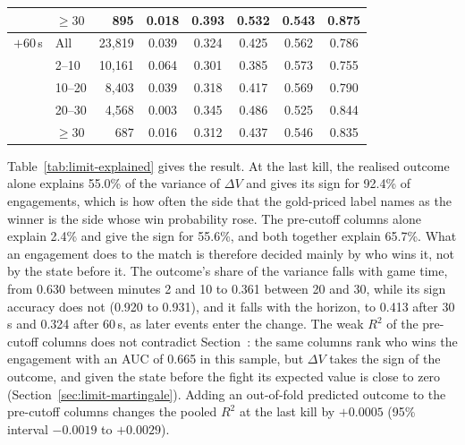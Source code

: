 \begin{table}[!t]
\begin{tabular}{@{}llrccccc@{}}
 & $\geq 30$ & 895 & 0.018 & 0.393 & 0.532 & 0.543 & 0.875 \\
\midrule
$+60$\,s & All & 23,819 & 0.039 & 0.324 & 0.425 & 0.562 & 0.786 \\
 & 2--10 & 10,161 & 0.064 & 0.301 & 0.385 & 0.573 & 0.755 \\
 & 10--20 & 8,403 & 0.039 & 0.318 & 0.417 & 0.569 & 0.790 \\
 & 20--30 & 4,568 & 0.003 & 0.345 & 0.486 & 0.525 & 0.844 \\
 & $\geq 30$ & 687 & 0.016 & 0.312 & 0.437 & 0.546 & 0.835 \\
\bottomrule
\end{tabular}
\end{table}

Table~\ref{tab:limit-explained} gives the result. At the last kill, the realised outcome alone explains
55.0\% of the variance of $\Delta V$ and gives its sign for 92.4\% of engagements, which is how often the
side that the gold-priced label names as the winner is the side whose win probability rose. The
pre-cutoff columns alone explain 2.4\% and give the sign for 55.6\%, and both together explain 65.7\%.
What an engagement does to the match is therefore decided mainly by who wins it, not by the state before
it. The outcome's share of the variance falls with game time, from 0.630 between minutes 2 and 10 to
0.361 between 20 and 30, while its sign accuracy does not (0.920 to 0.931), and it falls with the
horizon, to 0.413 after 30\,s and 0.324 after 60\,s, as later events enter the change. The weak $R^2$ of
the pre-cutoff columns does not contradict Section~: the same columns rank who wins
the engagement with an AUC of 0.665 in this sample, but $\Delta V$ takes the sign of the outcome, and
given the state before the fight its expected value is close to zero
(Section~\ref{sec:limit-martingale}). Adding an out-of-fold predicted outcome to the pre-cutoff columns
changes the pooled $R^2$ at the last kill by $+0.0005$ (95\% interval $-0.0019$ to $+0.0029$).

